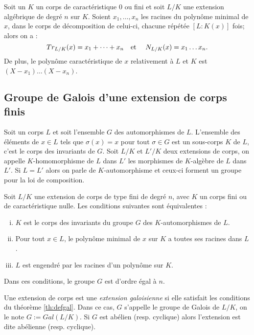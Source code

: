 \documentclass[a4paper]{article} %
\numberwithin{section}{part}
\numberwithin{equation}{section}
\newcommand\etmath{\textup{\quad et \quad}}
\begin{document}
\begin{prop}
Soit un $K$ un corps de caractéristique 0 ou fini et soit $L/K$ une extension
algébrique de degré $n$ sur $K$. Soient $x_1,\dots, x_n$ les racines du polynôme
minimal de $x$, dans le corps de décomposition de celui-ci, chacune répétée 
$[L:K(x)]$ fois; alors on a :
\begin{equation}
Tr_{L/K}(x) = x_1 + \dots + x_n \etmath N_{L/K}(x) = x_1\dots x_n.
\end{equation}
De plus, le polynôme caractéristique de $x$ relativement à $L$ et $K$ est $(X -
x_1)\dots(X - x_n)$.
\end{prop}
\subsection{Groupe de Galois d'une extension de corps finis}
Soit un corps $L$ et soit l'ensemble $G$ des automorphismes de $L$. L'ensemble 
des éléments de $x\in L$ tels que $\sigma(x) = x$ pour tout $\sigma\in G$ est un
sous-corps $K$ de $L$, c'est le corps des invariants de $G$. Soit $L/K$ et
$L'/K$ deux extensions de corps, on appelle $K$-homomorphisme de $L$ dans $L'$ 
les morphismes de $K$-algèbre de $L$ dans $L'$. Si $L = L'$ alors on parle de
$K$-automorphisme et ceux-ci forment un groupe pour la loi de composition.

\begin{thm}
\label{th:defgal}
Soit $L/K$ une extension de corps de type fini de degré $n$, avec $K$ un corps
fini ou de caractéristique nulle. Les conditions suivantes sont équivalentes :
\begin{enumerate}[(i)]
	\item $K$ est le corps des invariants du groupe $G$ des $K$-automorphismes
de $L$.
	\item Pour tout $x\in L$, le polynôme minimal de $x$ sur $K$ a toutes ses
racines dans $L$.
	\item $L$ est engendré par les racines d'un polynôme sur $K$.
\end{enumerate}
Dans ces conditions, le groupe $G$ est d'ordre égal à $n$.
\end{thm}

\begin{defn}
\label{def:gal}
Une extension de corps est une \emph{extension galoisienne} si elle satisfait 
les conditions du théorème \ref{th:defgal}. Dans ce cas, $G$ s'appelle le groupe
de Galois de $L/K$, on le note $G := Gal(L/K)$. Si $G$ est abélien (resp. 
cyclique) alors l'extension est dite abélienne (resp. cyclique).
\end{defn}
\end{document}
